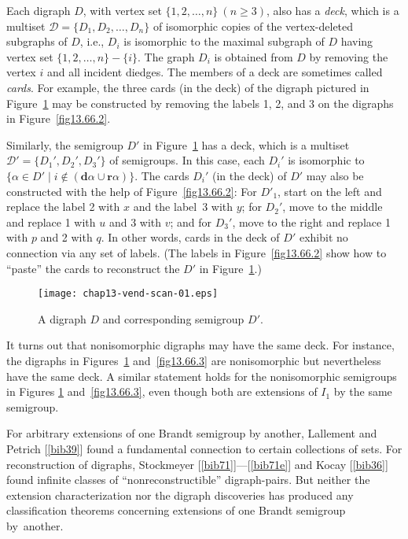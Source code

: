 \documentclass{surv-l}
\numberwithin{equation}{section}
\numberwithin{table}{section}
\numberwithin{figure}{section}
\theoremstyle{plain}
\theoremstyle{definition}
\begin{document}
Each digraph $D$, with vertex set $\{1, 2,
\ldots, n\}\ (n\geq 3)$, also has a \emph{deck}, which is a
multiset $\mathcal{D}=\{D_{1},D_{2},\ldots, D_{n}\}$ of isomorphic
copies of the vertex-deleted subgraphs of $D$, i.e., $D_{i}$ is
isomorphic to the maximal subgraph of $D$ having vertex set $\{1,
2,\ldots,n\}-\{i\}$. The graph $D_{i}$ is obtained from $D$ by
removing the vertex $i$ and all incident diedges. The members of a
deck are sometimes called \emph{cards}. For example, the three
cards (in the deck) of the digraph pictured in
Figure~\ref{fig13.66.1} may be constructed by removing the labels
1, 2, and 3 on the digraphs in Figure~\ref{fig13.66.2}.

Similarly, the semigroup $D'$ in Figure~\ref{fig13.66.1} has a
deck, which is a multiset $\mathcal{D}'=\{D_{1}', D_{2}',
D_{3}'\}$ of semigroups. In this case, each $D_{i}'$ is isomorphic
to $\{\alpha\in D'\mid i\not\in(\mathbf{d}\alpha\cup
\mathbf{r}\alpha)\}$. The cards $D_{i}'$ (in the deck) of $D'$ may
also be constructed with the help of Figure~\ref{fig13.66.2}: For
$D'_{1}$, start on the left and replace the label 2 with $x$ and the
label~3 with $y$; for $D_{2}'$, move to the middle and replace 1
with $u$ and 3 with $v$; and for $D_{3}'$, move to the right and
replace 1 with $p$ and 2 with $q$. In other words, cards in the
deck of $D'$ exhibit no connection via any set of labels. (The
labels in Figure~\ref{fig13.66.2} show how to ``paste'' the cards
to reconstruct the $D'$ in Figure~\ref{fig13.66.1}.)

\begin{figure}[!h]
\texttt{[image: chap13-vend-scan-01.eps]}
\caption{A digraph $D$ and corresponding semigroup $D'$.}\label{fig13.66.1}
\end{figure}

It turns out that nonisomorphic digraphs may have the same deck.
For instance, the digraphs in Figures~\ref{fig13.66.1}
and~\ref{fig13.66.3} are nonisomorphic but nevertheless have the
same deck. A similar statement holds for the nonisomorphic
semigroups in Figures \ref{fig13.66.1} and~\ref{fig13.66.3}, even
though both are extensions of $I_{1}$ by the same semigroup.

For arbitrary extensions of one Brandt semigroup by another,
Lallement and Petrich
[\ref{bib39}] found a fundamental connection to
certain collections of sets. For reconstruction of digraphs,
Stockmeyer
[\ref{bib71}]---[\ref{bib71e}]
and Kocay [\ref{bib36}]
found infinite classes of ``nonreconstructible'' digraph-pairs.
But neither the extension characterization nor the digraph
discoveries has produced any classification theorems concerning
extensions of one Brandt semigroup by~another.
\end{document}
